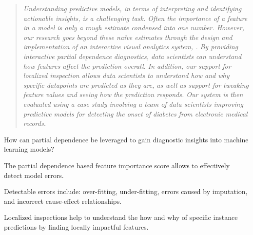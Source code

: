 \begin{quote}\textit{
Understanding predictive models, in terms of interpreting and identifying actionable
insights, is a challenging task.
Often the importance of a feature in a model is only a rough estimate
condensed into one number.  However, our research goes beyond these na\"ive estimates through the design and implementation of an interactive visual analytics system,
\prospector. By providing interactive partial dependence diagnostics, data scientists can understand how features affect the prediction overall.  In addition, our support for localized inspection allows data scientists to understand how and why specific datapoints are predicted as they are, as well as support for  tweaking feature values and seeing how the prediction responds.  Our system is then evaluated using a case study involving a team of data scientists improving predictive models for detecting the onset of diabetes from electronic medical records.
}\end{quote}

\begin{contributions}{How can partial dependence be leveraged to gain diagnostic insights into machine learning models?}
\item The partial dependence based feature importance score allows to effectively detect model errors.
\item Detectable errors include: over-fitting, under-fitting, errors caused by imputation, and incorrect cause-effect relationships.
\item Localized inspections help to understand the how and why of specific instance predictions by finding locally impactful features.
\end{contributions}


